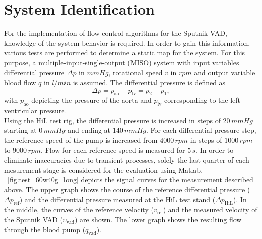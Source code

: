 \section{System Identification}
For the implementation of flow control algorithms for the Sputnik VAD, knowledge of the system behavior is required. In order to gain this information, various tests are performed to determine a static map for the system. For this purpose, a multiple-input-single-output (MISO) system with input variables differential pressure $\Delta{p}$ in $mmHg$, rotational speed $v$ in $rpm$ and output variable blood flow $q$ in $l/min$ is assumed. The differential pressure is defined as
\begin{equation}
  \Delta{p} = p_{\mathrm{ao}} - p_{\mathrm{lv}} = p_{\mathrm{2}} - p_{\mathrm{1}},
\end{equation}
with $p_{\mathrm{ao}}$ depicting the pressure of the aorta and $p_{\mathrm{lv}}$ corresponding to the left ventricular pressure.
\\Using the HiL test rig, the differential pressure is increased in steps of $20\, mmHg$ starting at $0\,mmHg$ and ending at $140\,mmHg$. For each differential pressure step, the reference speed of the pump is increased from $4000\, rpm$ in steps of $1000\, rpm$ to $9000\, rpm$. Flow for each reference speed is measured for $5\, s$. In order to eliminate inaccuracies due to transient processes, solely the last quarter of each mesurement stage is considered for the evaluation using Matlab. \figurename~\ref{fig:test_60w40g_long} depicts the signal curves for the measurement described above. The upper graph shows the course of the reference differential pressure ($\Delta{p_{\mathrm{ref}}}$) and the differential pressure measured at the HiL test stand ($\Delta{p_{\mathrm{HiL}}}$).
In the middle, the curves of the reference velocity ($v_{\mathrm{ref}}$) and the measured velocity of the Sputnik VAD ($v_{\mathrm{vad}}$) are shown. The lower graph shows the resulting flow through the blood pump ($q_{\mathrm{vad}}$).



